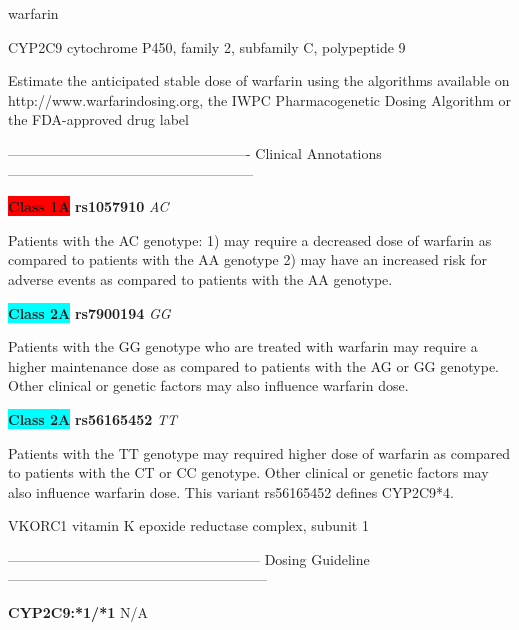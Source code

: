 \documentclass{resume} %
\begin{document}
\begin{rSection}{ warfarin }
\begin{rSubsection}{ CYP2C9 }{ cytochrome P450, family 2, subfamily C, polypeptide 9 }{}{}
\item[] Estimate the anticipated stable dose of warfarin using the algorithms available on http://www.warfarindosing.org, the IWPC Pharmacogenetic Dosing Algorithm or the FDA-approved drug label
\item[] ---------------------------------------------------- Clinical Annotations -----------------------------------------------------\newline
\item \textbf{\colorbox{red} {Class 1A}} \textbf{ rs1057910 } \textit{ AC }
\item[] Patients with the AC genotype: 1) may require a decreased dose of warfarin as compared to patients with the AA genotype 2) may have an increased risk for adverse events as compared to patients with the AA genotype.\item \textbf{\colorbox{cyan} {Class 2A}} \textbf{ rs7900194 } \textit{ GG }
\item[] Patients with the GG genotype who are treated with warfarin may require a higher maintenance dose as compared to patients with the AG or GG genotype.  Other clinical or genetic factors may also influence warfarin dose.\item \textbf{\colorbox{cyan} {Class 2A}} \textbf{ rs56165452 } \textit{ TT }
\item[] Patients with the TT genotype may required higher dose of warfarin as compared to patients with the CT or CC genotype. Other clinical or genetic factors may also influence  warfarin dose. This variant rs56165452 defines CYP2C9*4.
\end{rSubsection}\begin{rSubsection}{ VKORC1 }{ vitamin K epoxide reductase complex, subunit 1 }{}{}
\item[]
\item[] ------------------------------------------------------ Dosing Guideline --------------------------------------------------------\newline
\item[]
\item[] \textbf{ CYP2C9:*1/*1 } N/A


\end{rSubsection}
\end{rSection}
\end{document}
